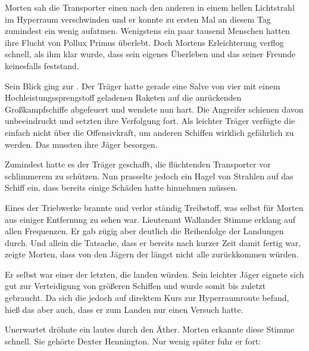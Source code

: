 Morten sah die Transporter einen nach den anderen in einem hellen Lichtstrahl im Hyperraum verschwinden und er konnte zu ersten Mal an diesem Tag zumindest ein wenig aufatmen. Wenigstens ein paar tausend Menschen hatten ihre Flucht von Pollux Primus überlebt. Doch Mortens Erleichterung verflog schnell, als ihm klar wurde, dass sein eigenes Überleben und das seiner Freunde keinesfalls feststand.

\par

Sein Blick ging zur . Der Träger hatte gerade eine Salve von vier mit einem Hochleistungssprengstoff geladenen Raketen auf die anrückenden Großkampfschiffe abgefeuert und wendete nun hart. Die Angreifer schienen davon unbeeindruckt und setzten ihre Verfolgung fort. Als leichter Träger verfügte die  einfach nicht über die Offensivkraft, um anderen Schiffen wirklich gefährlich zu werden. Das mussten ihre Jäger besorgen.

\par

Zumindest hatte es der Träger geschafft, die flüchtenden Transporter vor schlimmerem zu schützen. Nun prasselte jedoch ein Hagel von Strahlen auf das Schiff ein, dass bereits einige Schäden hatte hinnehmen müssen.

\par

Eines der Triebwerke brannte und verlor ständig Treibstoff, was selbst für Morten aus einiger Entfernung zu sehen war. Lieutenant Wallander Stimme erklang auf allen Frequenzen. Er gab zügig aber deutlich die Reihenfolge der Landungen durch. Und allein die Tatsache, dass er bereits nach kurzer Zeit damit fertig war, zeigte Morten, dass von den Jägern der  längst nicht alle zurückkommen würden.

\par

Er selbst war einer der letzten, die landen würden. Sein leichter Jäger eignete sich gut zur Verteidigung von größeren Schiffen und wurde somit bis zuletzt gebraucht. Da sich die  jedoch auf direktem Kurs zur Hyperraumroute befand, hieß das aber auch, dass er zum Landen nur einen Versuch hatte.

\par

Unerwartet dröhnte ein lautes  durch den Äther. Morten erkannte diese Stimme schnell. Sie gehörte Dexter Hennington. Nur wenig später fuhr er fort: 

